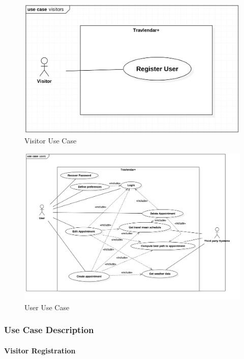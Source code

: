 \documentclass[12pt]{article}
\begin{document}
\begin{figure}[H]
        \includegraphics[scale=0.4]{visitorUseCase.png}
        \centering
        \caption{Visitor Use Case}
    \label{fig:visitorUseCase}
\end{figure}


\begin{figure}[H]
        \includegraphics[scale=0.5]{userUseCase.png}
        \centering
        \caption{User Use Case}
    \label{fig:userUseCase}
\end{figure}
    
\newpage

\subsubsection{Use Case Description}
\paragraph{Visitor Registration}
\end{document}
